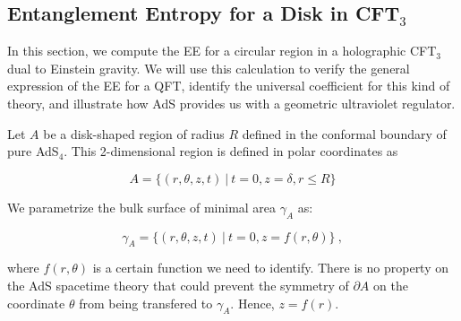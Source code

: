 \documentclass[twocolumn]{revtex4}
\providecommand{\eq}[2]{
    \begin{equation}
        #2
    \label{eq:#1}
    \end{equation}
}
\begin{document}
\subsection{Entanglement Entropy for a Disk in CFT$_3$} \label{ss:EE-disk}

In this section, we compute the EE for a circular region in a holographic CFT$_3$ dual to Einstein gravity. We will use this calculation to verify the general expression of the EE for a QFT, identify the universal coefficient for this kind of theory, and illustrate how AdS provides us with a geometric ultraviolet regulator.

Let $A$ be a disk-shaped region of radius $R$ defined in the conformal boundary of pure AdS$_4$. This 2-dimensional region is defined in polar coordinates as
\eq{1A}{
    A = \{ ( r, \theta, z, t ) \ | \ t = 0, z = \delta, r \le R \} \nonumber
}
We parametrize the bulk surface of minimal area $\gamma_A$ as:
\eq{1gA}{
    \gamma_A = \{ ( r, \theta, z, t ) \ | \ t = 0, z = f (r, \theta) \} \ , \nonumber
}
where $f(r,\theta)$ is a certain function we need to identify. There is no property on the AdS spacetime theory that could prevent the symmetry of $\partial A$ on the coordinate $\theta$ from being transfered to $\gamma_A$. Hence, $z=f(r)$.
\end{document}

